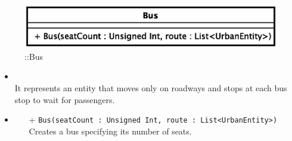 \begin{figure}[h]
\centering
\includegraphics[scale=0.6,keepaspectratio]{images/solution/bus.eps}
\caption{\pActive::Bus}
\label{fig:sd-app-bus}
\end{figure}
\FloatBarrier
\begin{itemize}
  \item \textbf{\descr} \\
It represents an entity that moves only on roadways and stops at each bus stop to
wait for passengers.
\item \textbf{\ops}
  \begin{itemize}
  \item[+] \texttt{Bus(seatCount : Unsigned Int, route : List<UrbanEntity>)} \\
Creates a bus specifying its number of seats.
  \end{itemize}
\end{itemize} 
